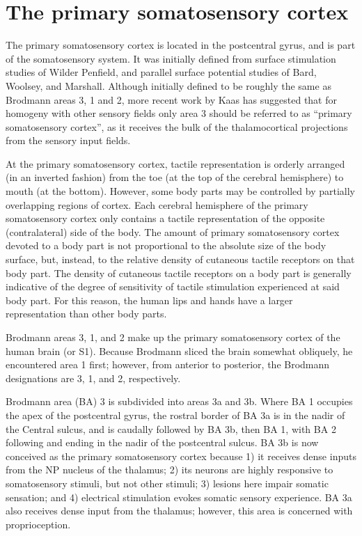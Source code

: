 \documentclass[]{book}
\begin{document}
\hypertarget{the-primary-somatosensory-cortex}{%
\section{The primary somatosensory cortex}\label{the-primary-somatosensory-cortex}}

The primary somatosensory cortex is located in the postcentral gyrus, and is part of the somatosensory system. It was initially defined from surface stimulation studies of Wilder Penfield, and parallel surface potential studies of Bard, Woolsey, and Marshall. Although initially defined to be roughly the same as Brodmann areas 3, 1 and 2, more recent work by Kaas has suggested that for homogeny with other sensory fields only area 3 should be referred to as ``primary somatosensory cortex'', as it receives the bulk of the thalamocortical projections from the sensory input fields.

At the primary somatosensory cortex, tactile representation is orderly arranged (in an inverted fashion) from the toe (at the top of the cerebral hemisphere) to mouth (at the bottom). However, some body parts may be controlled by partially overlapping regions of cortex. Each cerebral hemisphere of the primary somatosensory cortex only contains a tactile representation of the opposite (contralateral) side of the body. The amount of primary somatosensory cortex devoted to a body part is not proportional to the absolute size of the body surface, but, instead, to the relative density of cutaneous tactile receptors on that body part. The density of cutaneous tactile receptors on a body part is generally indicative of the degree of sensitivity of tactile stimulation experienced at said body part. For this reason, the human lips and hands have a larger representation than other body parts.

Brodmann areas 3, 1, and 2 make up the primary somatosensory cortex of the human brain (or S1). Because Brodmann sliced the brain somewhat obliquely, he encountered area 1 first; however, from anterior to posterior, the Brodmann designations are 3, 1, and 2, respectively.

Brodmann area (BA) 3 is subdivided into areas 3a and 3b. Where BA 1 occupies the apex of the postcentral gyrus, the rostral border of BA 3a is in the nadir of the Central sulcus, and is caudally followed by BA 3b, then BA 1, with BA 2 following and ending in the nadir of the postcentral sulcus. BA 3b is now conceived as the primary somatosensory cortex because 1) it receives dense inputs from the NP nucleus of the thalamus; 2) its neurons are highly responsive to somatosensory stimuli, but not other stimuli; 3) lesions here impair somatic sensation; and 4) electrical stimulation evokes somatic sensory experience. BA 3a also receives dense input from the thalamus; however, this area is concerned with proprioception.
\end{document}

